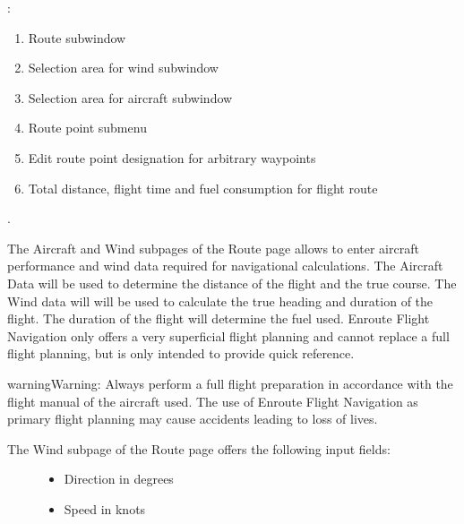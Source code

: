 \documentclass[letterpaper,10pt,english]{sphinxmanual}
\begin{document}
\begin{figure}[htbp]
\centering

\noindent{}
\end{figure}

:
\begin{enumerate}
%
\item {} 
Route sub\sphinxhyphen{}window

\item {} 
Selection area for wind sub\sphinxhyphen{}window

\item {} 
Selection area for aircraft sub\sphinxhyphen{}window

\item {} 
Route point sub\sphinxhyphen{}menu

\item {} 
Edit route point designation for arbitrary waypoints

\item {} 
Total distance, flight time and fuel consumption for flight route

\end{enumerate}

.


The Aircraft and Wind sub\sphinxhyphen{}pages of the Route page allows to enter aircraft performance and wind data required for navigational calculations.
The Aircraft Data will be used to determine the distance of the flight and the true course.
The Wind data will will be used to calculate the true heading and duration of the flight. The duration of the flight will determine the fuel used.
Enroute Flight Navigation only offers a very superficial flight planning and cannot replace a full flight planning, but is only intended to provide quick reference.

\begin{sphinxadmonition}{warning}{Warning:}
Always perform a full flight preparation in accordance with the flight manual of the aircraft used. The use of Enroute Flight Navigation as primary flight planning may cause accidents leading to loss of lives.
\end{sphinxadmonition}
\begin{description}
\item[{The Wind sub\sphinxhyphen{}page of the Route page offers the following input fields:}] \leavevmode\begin{itemize}
\item {} 
Direction in degrees

\item {} 
Speed in knots

\end{itemize}

\end{description}
\end{document}
